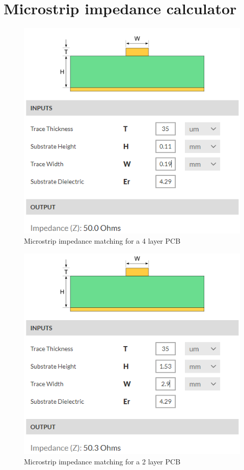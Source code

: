 \chapter{Microstrip impedance calculator}
\begin{figure}[h!]
\centering
\includegraphics[scale=0.8]{figures/PCBmatching4.PNG}
\caption{Microstrip impedance matching for a 4 layer PCB\cite{MicrostripCalcu}}
\end{figure}

\begin{figure}[h!]
\centering
\includegraphics[scale=0.8]{figures/PCBmatching2.PNG}
\caption{Microstrip impedance matching for a 2 layer PCB\cite{MicrostripCalcu}}
\end{figure}
